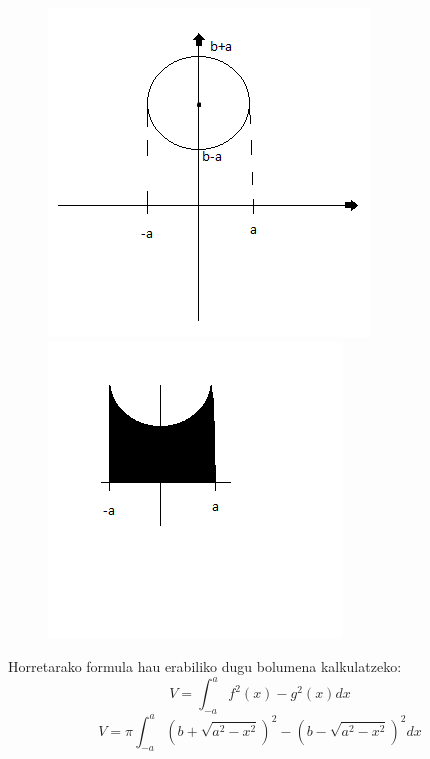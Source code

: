     
   \begin{figure}[h]
    
 \includegraphics[scale=1]{4.png}
 \includegraphics[scale=1.2]{4b.png}
    \end{figure}
    \newpage
    
    
Horretarako formula hau erabiliko dugu bolumena kalkulatzeko:\\

$$V=\int_{-a}^{a} f^2(x)-g^2(x) dx$$
$$V= \pi \int_{-a}^{a} (b+\sqrt{a^2-x^2})^2-(b-\sqrt{a^2-x^2})^2 dx$$


    
    
    
    
    
    
    
    
